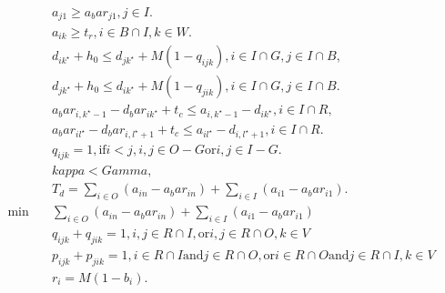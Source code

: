 \begin{align}
  & a_{j 1} \geq a_bar_{j 1} , j \in I . \tag{eq\_0018} \\
  & a_{i k} \geq t_{r} , i \in B \cap I , k \in W . \tag{eq\_0019} \\
  & d_{i k^{\star}} + h_{0} \leq d_{j k^{\star}} + M \left(1 - q_{i j k}\right) , i \in I \cap G , j \in I \cap B , \tag{eq\_0020} \\
  & d_{j k^{\star}} + h_{0} \leq d_{i k^{\star}} + M \left(1 - q_{j i k}\right) , i \in I \cap G , j \in I \cap B . \tag{eq\_0021} \\
  & a_bar_{i , k^{\star} - 1} - d_bar_{i k^{\star}} + t_{c} \leq a_{i , k^{\star} - 1} - d_{i k^{\star}} , i \in I \cap R , \tag{eq\_0022} \\
  & a_bar_{i l^{\star}} - d_bar_{i , l^{\star} + 1} + t_{c} \leq a_{i l^{\star}} - d_{i , l^{\star} + 1} , i \in I \cap R . \tag{eq\_0023} \\
  & q_{i j k} = 1 , \text{if} i < j , i , j \in O - G \text{or} i , j \in I - G . \tag{eq\_0024} \\
  & \mathit{kappa} < \mathit{Gamma} , \tag{eq\_0025} \\
  & T_{d} = \sum_{i \in O} \left(a_{i n} - a_bar_{i n}\right) + \sum_{i \in I} \left(a_{i 1} - a_bar_{i 1}\right) . \tag{eq\_0026} \\
  \min\quad & \sum_{i \in O} \left(a_{i n} - a_bar_{i n}\right) + \sum_{i \in I} \left(a_{i 1} - a_bar_{i 1}\right) \tag{eq\_0027\_a} \\
  & q_{i j k} + q_{j i k} = 1 , i , j \in R \cap I , \text{or} i , j \in R \cap O , k \in V \tag{eq\_0027\_b} \\
  & p_{i j k} + p_{j i k} = 1 , i \in R \cap I \text{and} j \in R \cap O , \text{or} i \in R \cap O \text{and} j \in R \cap I , k \in V \tag{eq\_0027\_c} \\
  & r_{i} = M \left(1 - b_{i}\right) . \tag{eq\_0029} \\
\end{align}
